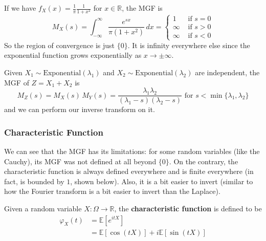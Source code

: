 \documentclass{article}
\begin{document}
      \begin{example}[Cauchy RV]
        If we have $f_X (x) = \frac{1}{\pi} \frac{1}{1 + x^2}$ for $x \in \mathbb{R}$, the MGF is 
        \begin{equation}
          M_X (s) = \int_{-\infty}^\infty \frac{e^{s x}}{\pi (1 + x^2)} \,dx = \begin{cases} 1 & \text{ if } s = 0 \\
          \infty & \text{ if } s > 0 \\ 
          \infty & \text{ if } s < 0 \end{cases}
        \end{equation}
        So the region of convergence is just $\{0\}$. It is infinity everywhere else since the exponential function grows exponentially as $x \rightarrow \pm \infty$. 
      \end{example}

      \begin{example}
        Given $X_1 \sim \mathrm{Exponential}(\lambda_1)$ and $X_2 \sim \mathrm{Exponential}(\lambda_2)$ are independent, the MGF of $Z = X_1 + X_2$ is 
        \begin{equation}
          M_Z (s) = M_X (s) \, M_Y (s) = \frac{\lambda_1 \lambda_2}{(\lambda_1 - s)(\lambda_2 - s)} \text{ for } s < \min\{\lambda_1, \lambda_2\}
        \end{equation}
        and we can perform our inverse transform on it. 
      \end{example}

    \subsubsection{Characteristic Function}

      We can see that the MGF has its limitations: for some random variables (like the Cauchy), its MGF was not defined at all beyond $\{0\}$. On the contrary, the characteristic function is always defined everywhere and is finite everywhere (in fact, is bounded by $1$, shown below). Also, it is a bit easier to invert (similar to how the Fourier transform is a bit easier to invert than the Laplace). 

      \begin{definition}
        Given a random variable $X: \Omega \longrightarrow \mathbb{R}$, the \textbf{characteristic function} is defined to be 
        \begin{align*}
          \varphi_X (t) & = \mathbb{E}[ e^{i t X} ] \\
          & = \mathbb{E}[\cos{(t X)}] + i \mathbb{E}[ \sin{(t X)}]
        \end{align*}
      \end{definition}
\end{document}
